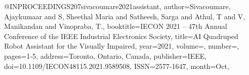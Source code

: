 @INPROCEEDINGS{207sivacoumare2021assistant,
author={Sivacoumare, Ajaykumaar and S, Sheethal Maria and Satheesh, Sarga and Athul, T and V, Manikandan and Vinopraba, T.},
booktitle={IECON 2021 – 47th Annual Conference of the IEEE Industrial Electronics Society}, 
title={AI Quadruped Robot Assistant for the Visually Impaired}, 
year={2021},
volume={},
number={},
pages={1-5},
address={Toronto, Ontario, Canada},
publisher={IEEE},
doi={10.1109/IECON48115.2021.9589508},
ISSN={2577-1647},
month={Oct},}